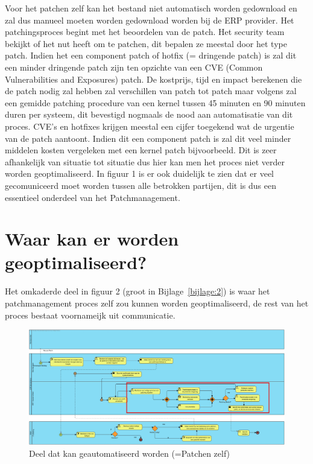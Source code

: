 Voor het patchen zelf kan het bestand niet automatisch worden gedownload en zal dus manueel moeten worden gedownload worden bij de ERP provider. Het patchingsproces begint met het beoordelen van de patch. Het security team bekijkt of het nut heeft
om te patchen, dit bepalen ze meestal door het type patch. Indien het een component patch of hotfix (= dringende patch) is zal dit een minder dringende patch zijn ten opzichte van een CVE (Common Vulnerabilities and Exposures) patch. De kostprijs, tijd en impact berekenen
die de patch nodig zal hebben zal verschillen van patch tot patch maar volgens \textcite{Heyndrickx2024} zal een gemidde patching procedure van een kernel tussen 45 minuten en 90 minuten duren per systeem, dit bevestigd nogmaals de nood aan automatisatie van dit proces. CVE's en hotfixes krijgen meestal een cijfer toegekend wat de urgentie van de patch aantoont. Indien dit een component patch is zal dit veel minder middelen kosten vergeleken
met een kernel patch bijvoorbeeld. Dit is zeer afhankelijk van situatie tot situatie dus hier kan men het proces niet verder worden geoptimaliseerd. In figuur 1 is er ook duidelijk te zien dat er veel gecomuniceerd moet worden tussen alle betrokken partijen, dit is dus een essentieel onderdeel van het Patchmanagement. \\


\section{Waar kan er worden geoptimaliseerd?}

Het omkaderde deel in figuur 2 (groot in Bijlage~\ref{bijlage:2}) is waar het patchmanagement proces zelf zou kunnen worden geoptimaliseerd, de rest van het proces bestaat voornameijk uit communicatie.
 \begin{figure}[htbp]
    \centering
    \includegraphics[width=\textwidth]{huidigesituatie2.png}
    \caption{Deel dat kan geautomatiseerd worden (=Patchen zelf)}
     \label{fig:huidigesituatie2}
\end{figure}


